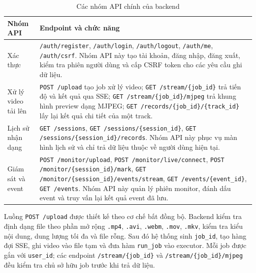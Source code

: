 \documentclass[../DoAn.tex]{subfiles}
\begin{document}
\begin{table}[H]
\centering
\renewcommand{\arraystretch}{1.15}
\begin{tabular}{|p{3.6cm}|p{9.8cm}|}
\hline
\textbf{Nhóm API} & \textbf{Endpoint và chức năng} \\ \hline
Xác thực & \texttt{/auth/register}, \texttt{/auth/login}, \texttt{/auth/logout}, \texttt{/auth/me}, \texttt{/auth/csrf}. Nhóm API này tạo tài khoản, đăng nhập, đăng xuất, kiểm tra phiên người dùng và cấp CSRF token cho các yêu cầu ghi dữ liệu. \\ \hline
Xử lý video tải lên & \texttt{POST /upload} tạo job xử lý video; \newline \texttt{GET /stream/\{job\_id\}} trả tiến độ và kết quả qua SSE; \newline \texttt{GET /stream/\{job\_id\}/mjpeg} trả khung hình preview dạng MJPEG; \newline \texttt{GET /records/\{job\_id\}/\{track\_id\}} lấy lại kết quả chi tiết của một track. \\ \hline
Lịch sử nhận dạng & \texttt{GET /sessions}, \texttt{GET /sessions/\{session\_id\}}, \texttt{GET /sessions/\{session\_id\}/records}. Nhóm API này phục vụ màn hình lịch sử và chỉ trả dữ liệu thuộc về người dùng hiện tại. \\ \hline
Giám sát và event & \texttt{POST /monitor/upload}, \texttt{POST /monitor/live/connect}, \newline \texttt{POST /monitor/\{session\_id\}/mark}, \newline \texttt{GET /monitor/\{session\_id\}/events/stream}, \newline \texttt{GET /events/\{event\_id\}}, \texttt{GET /events}. Nhóm API này quản lý phiên monitor, đánh dấu event và truy vấn lại kết quả event đã lưu. \\ \hline
\end{tabular}
\caption{Các nhóm API chính của backend}
\label{table:backend_api_groups}
\end{table}

Luồng \texttt{POST /upload} được thiết kế theo cơ chế bất đồng bộ. Backend kiểm tra định dạng file theo phần mở rộng \texttt{.mp4}, \texttt{.avi}, \texttt{.webm}, \texttt{.mov}, \texttt{.mkv}, kiểm tra kiểu nội dung, dung lượng tối đa và file rỗng. Sau đó hệ thống sinh \texttt{job\_id}, tạo hàng đợi SSE, ghi video vào file tạm và đưa hàm \texttt{run\_job} vào executor. Mỗi job được gắn với \texttt{user\_id}; các endpoint \texttt{/stream/\{job\_id\}} và \texttt{/stream/\{job\_id\}/mjpeg} đều kiểm tra chủ sở hữu job trước khi trả dữ liệu.
\end{document}

